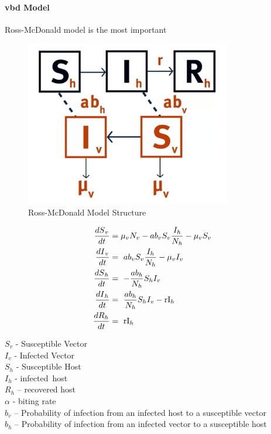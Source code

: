 \documentclass[a4paper, 12pt, twoside]{article}
\begin{document}
\paragraph{\gls{vbd} Model}
Ross-McDonald model is the most important

\begin{figure}[htpb]
	\centering
	\includegraphics[width=0.8\textwidth]{ross-mcdonald}
	\caption{Ross-McDonald Model Structure}
	\label{fig:ross-mcdonald}
\end{figure}

\begin{align}
	\frac{{dS}_v}{dt} & = \mu_v N_v - ab_vS_v\frac{I_h}{N_h} - \mu_v S_v \\
	\frac{{dI}_v}{dt} & =\ ab_vS_v\frac{I_h}{N_h}-\mu_v I_v              \\
	\frac{{dS}_h}{dt} & =\ -\frac{ab_h}{N_h}S_hI_v                       \\
	\frac{{dI}_h}{dt} & =\ \frac{ab_h}{N_h}S_hI_v-{\rm rI}_h             \\
	\frac{{dR}_h}{dt} & =\ {\rm rI}_h
\end{align}
\begin{centering}
	$S_v$ - Susceptible Vector  \\
	$I_v$ - Infected Vector\\
	$S_h$ - Susceptible Host\\
	$I_h$ - infected\ host\\
	$R_h$ – recovered host\\
	$\alpha$ - biting rate \\
	$b_v$ – Probability of infection from an infected host to a susceptible vector\\
	$b_h$ – Probability of infection from an infected vector to a susceptible host
\end{centering}
\end{document}
